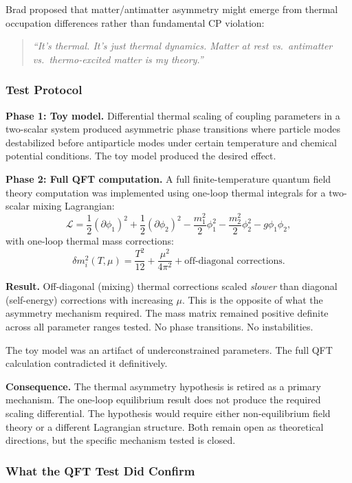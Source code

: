 \documentclass[11pt,twoside]{article}
\begin{document}
Brad proposed that matter/antimatter asymmetry might emerge from thermal occupation
differences rather than fundamental CP violation:

\begin{quote}
\emph{``It's thermal. It's just thermal dynamics. Matter at rest vs.\ antimatter vs.\
thermo-excited matter is my theory.''}
\end{quote}

\subsubsection{Test Protocol}

\textbf{Phase 1: Toy model.} Differential thermal scaling of coupling parameters in
a two-scalar system produced asymmetric phase transitions where particle modes
destabilized before antiparticle modes under certain temperature and chemical
potential conditions. The toy model produced the desired effect.

\textbf{Phase 2: Full QFT computation.}
A full finite-temperature quantum field theory computation was implemented using
one-loop thermal integrals for a two-scalar mixing Lagrangian:
\[
  \mathcal{L} = \frac{1}{2}(\partial\phi_1)^2 + \frac{1}{2}(\partial\phi_2)^2
  - \frac{m_1^2}{2}\phi_1^2 - \frac{m_2^2}{2}\phi_2^2 - g\phi_1\phi_2,
\]
with one-loop thermal mass corrections:
\[
  \delta m_i^2(T, \mu) = \frac{T^2}{12} + \frac{\mu^2}{4\pi^2} + \text{off-diagonal corrections}.
\]

\begin{retiredenv}
\textbf{Result.} Off-diagonal (mixing) thermal corrections scaled \emph{slower}
than diagonal (self-energy) corrections with increasing $\mu$. This is the opposite
of what the asymmetry mechanism required. The mass matrix remained positive definite
across all parameter ranges tested. No phase transitions. No instabilities.

The toy model was an artifact of underconstrained parameters. The full QFT calculation
contradicted it definitively.

\textbf{Consequence.} The thermal asymmetry hypothesis is retired as a primary
mechanism. The one-loop equilibrium result does not produce the required scaling
differential. The hypothesis would require either non-equilibrium field theory or a
different Lagrangian structure. Both remain open as theoretical directions, but the
specific mechanism tested is closed.
\end{retiredenv}

\subsubsection{What the QFT Test Did Confirm}
\end{document}
